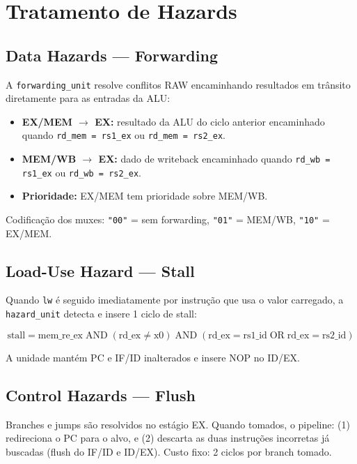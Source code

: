 \documentclass[12pt, a4paper]{article}
\newcommand{\code}[1]{\texttt{#1}}
\begin{document}
\section{Tratamento de Hazards}

\subsection{Data Hazards --- Forwarding}

A \code{forwarding\_unit} resolve conflitos RAW encaminhando resultados em
trânsito diretamente para as entradas da ALU:

\begin{itemize}[leftmargin=2em]
  \item \textbf{EX/MEM $\to$ EX:} resultado da ALU do ciclo anterior encaminhado
    quando \code{rd\_mem = rs1\_ex} ou \code{rd\_mem = rs2\_ex}.
  \item \textbf{MEM/WB $\to$ EX:} dado de writeback encaminhado quando
    \code{rd\_wb = rs1\_ex} ou \code{rd\_wb = rs2\_ex}.
  \item \textbf{Prioridade:} EX/MEM tem prioridade sobre MEM/WB.
\end{itemize}

Codificação dos muxes: \code{"00"} = sem forwarding, \code{"01"} = MEM/WB,
\code{"10"} = EX/MEM.

\subsection{Load-Use Hazard --- Stall}

Quando \code{lw} é seguido imediatamente por instrução que usa o valor
carregado, a \code{hazard\_unit} detecta e insere 1 ciclo de stall:

\begin{equation}
  \text{stall} = \text{mem\_re\_ex} \;\text{AND}\;
  (\text{rd\_ex} \neq \text{x0}) \;\text{AND}\;
  (\text{rd\_ex} = \text{rs1\_id} \;\text{OR}\; \text{rd\_ex} = \text{rs2\_id})
\end{equation}

A unidade mantém PC e IF/ID inalterados e insere NOP no ID/EX.

\subsection{Control Hazards --- Flush}

Branches e jumps são resolvidos no estágio EX. Quando tomados, o pipeline:
(1) redireciona o PC para o alvo, e (2) descarta as duas instruções incorretas
já buscadas (flush do IF/ID e ID/EX). Custo fixo: 2 ciclos por branch tomado.
\end{document}
